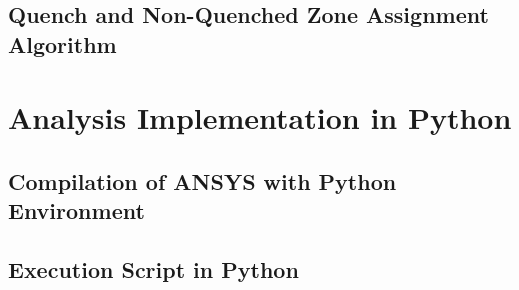 \documentclass[11pt,a4paper]{report}
\begin{document}
\begin{appendices}
\section{Quench and Non-Quenched Zone Assignment Algorithm}
\label{appendix:python_nodes_search_algorithm}
% 

\clearpage
\chapter{Analysis Implementation in Python}
\section{Compilation of ANSYS with Python Environment}
\label{appendix:python_ansys_compilation}


\section{Execution Script in Python}
\label{appendix:execution_script_python}
% 

\end{appendices}

\clearpage


\end{document}
